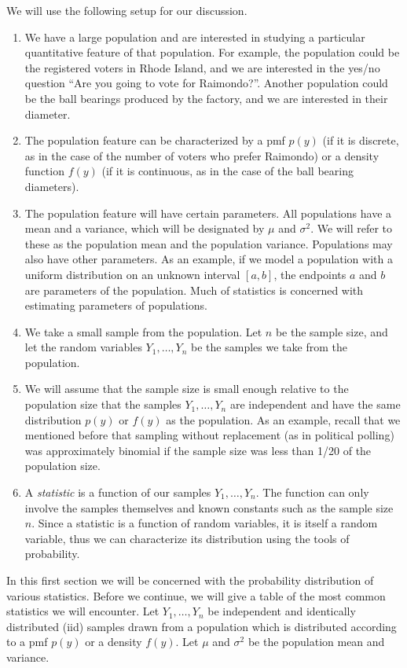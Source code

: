 \documentclass[notes.tex]{subfiles}
\begin{document}
We will use the following setup for our discussion.
\begin{enumerate}
\item We have a large population and are interested in studying a particular quantitative feature of that population. For example, the population could be the registered voters in Rhode Island, and we are interested in the yes/no question ``Are you going to vote for Raimondo?''. Another population could be the ball bearings produced by the factory, and we are interested in their diameter.
\item The population feature can be characterized by a pmf $p(y)$ (if it is discrete, as in the case of the number of voters who prefer Raimondo) or a density function $f(y)$ (if it is continuous, as in the case of the ball bearing diameters).
\item The population feature will have certain parameters. All populations have a mean and a variance, which will be designated by $\mu$ and $\sigma^2$. We will refer to these as the population mean and the population variance. Populations may also have other parameters. As an example, if we model a population with a uniform distribution on an unknown interval $[a, b]$, the endpoints $a$ and $b$ are parameters of the population. Much of statistics is concerned with estimating parameters of populations.
\item We take a small sample from the population. Let $n$ be the sample size, and let the random variables $Y_1, \dots, Y_n$ be the samples we take from the population. 
\item We will assume that the sample size is small enough relative to the population size that the samples $Y_1, \dots, Y_n$ are independent and have the same distribution $p(y)$ or $f(y)$ as the population. As an example, recall that we mentioned before that sampling without replacement (as in political polling) was approximately binomial if the sample size was less than 1/20 of the population size.
\item A \emph{statistic} is a function of our samples $Y_1, \dots, Y_n$. The function can only involve the samples themselves and known constants such as the sample size $n$. Since a statistic is a function of random variables, it is itself a random variable, thus we can characterize its distribution using the tools of probability. 
\end{enumerate}
In this first section we will be concerned with the probability distribution of various statistics. Before we continue, we will give a table of the most common statistics we will encounter. Let $Y_1, \dots, Y_n$ be independent and identically distributed (iid) samples drawn from a population which is distributed according to a pmf $p(y)$ or a density $f(y)$. Let $\mu$ and $\sigma^2$ be the population mean and variance.
\end{document}
